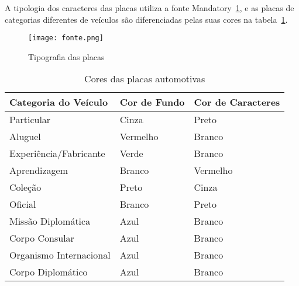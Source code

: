 A tipologia dos caracteres das placas utiliza a fonte
Mandatory~\ref{fig:tipografia}, e as placas de categorias diferentes de veículos
são diferenciadas pelas suas cores na tabela~\ref{tab:placa_cores}.

\begin{figure}[H]
		\centering
		\texttt{[image: fonte.png]}
		\caption{Tipografia das placas}
		\label{fig:tipografia}
\end{figure}

\begin{table}[]
\centering
\label{tab:placa_cores}
\caption{Cores das placas automotivas}
\begin{tabular}{|l|l|l|}
\hline
\textbf{Categoria do Veículo}                                               & \textbf{Cor de Fundo} & \textbf{Cor de Caracteres} \\ \hline
Particular                                                                  & Cinza                 & Preto                      \\ \hline
Aluguel                                                                     & Vermelho              & Branco                     \\ \hline
Experiência/Fabricante                                                      & Verde                 & Branco                     \\ \hline
Aprendizagem                                                                & Branco                & Vermelho                   \\ \hline
Coleção                                                                     & Preto                 & Cinza                      \\ \hline
Oficial                                                                     & Branco                & Preto                      \\ \hline
Missão Diplomática                                                          & Azul                  & Branco                     \\ \hline
Corpo Consular                                                              & Azul                  & Branco                     \\ \hline
Organismo Internacional                                                     & Azul                  & Branco                     \\ \hline
Corpo Diplomático                                                           & Azul                  & Branco                     \\ \hline

\end{tabular}
\end{table}
